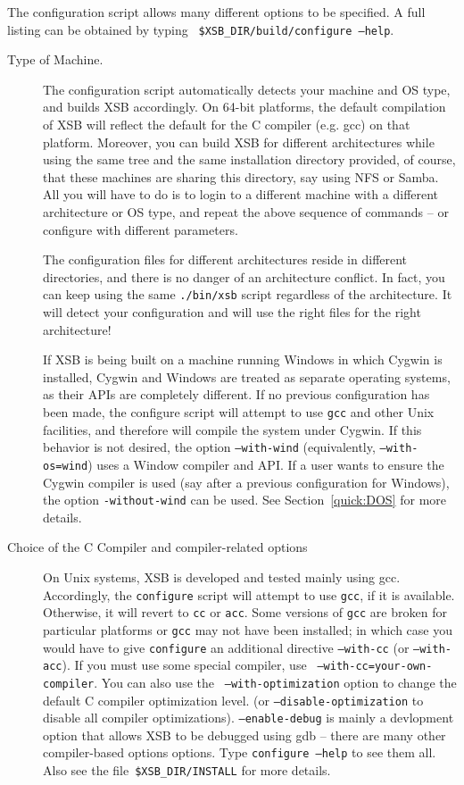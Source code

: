The configuration script allows many different options to be
specified.  A full listing can be obtained by typing {\tt
\$XSB\_DIR/build/configure --help}.
\begin{description}
\item[Type of Machine.]  The configuration script automatically
  detects your machine and OS type, and builds XSB accordingly. On
  64-bit platforms, the default compilation of XSB will reflect the
  default for the C compiler (e.g. gcc) on that platform.  Moreover,
  you can build XSB for different architectures while using the same
  tree and the same installation directory provided, of course, that
  these machines are sharing this directory, say using NFS or
  Samba. All you will have to do is to login to a different machine
  with a different architecture or OS type, and repeat the above
  sequence of commands -- or configure with different parameters.
  
  The configuration files for different architectures reside in
  different directories, and there is no danger of an architecture
  conflict.  In fact, you can keep using the same {\tt ./bin/xsb}
  script regardless of the architecture. It will detect your
  configuration and will use the right files for the right
  architecture!

  If XSB is being built on a machine running Windows in which Cygwin
  is installed, Cygwin and Windows are treated as separate operating
  systems, as their APIs are completely different.  If no previous
  configuration has been made, the configure script will attempt to
  use {\tt gcc} and other Unix facilities, and therefore will compile
  the system under Cygwin.  If this behavior is not desired, the
  option {\tt --with-wind} (equivalently, {\tt --with-os=wind}) uses a
  Window compiler and API.  If a user wants to ensure the Cygwin
  compiler is used (say after a previous configuration for Windows),
  the option {\tt -without-wind} can be used.  See
  Section~\ref{quick:DOS} for more details.

    
\item[Choice of the C Compiler and compiler-related
  options] \label{cc} On Unix systems, XSB is developed and tested
  mainly using gcc.  Accordingly, the {\tt configure} script will
  attempt to use {\tt gcc}, if it is available.  Otherwise, it will
  revert to {\tt cc} or {\tt acc}.  Some versions of {\tt gcc} are
  broken for particular platforms or {\tt gcc} may not have been
  installed; in which case you would have to give {\tt configure} an
  additional directive {\tt --with-cc} (or {\tt --with-acc}).  If you
  must use some special compiler, use {\tt
    --with-cc=your-own-compiler}.  You can also use the {\tt
    --with-optimization} option to change the default C compiler
  optimization level.  (or {\tt --disable-optimization} to disable all
  compiler optimizations).  {\tt --enable-debug} is mainly a
  devlopment option that allows XSB to be debugged using gdb -- there
  are many other compiler-based options options.  Type {\tt configure
    --help} to see them all. Also see the file~\verb'$XSB_DIR/INSTALL'
  for more details.


\end{description}
